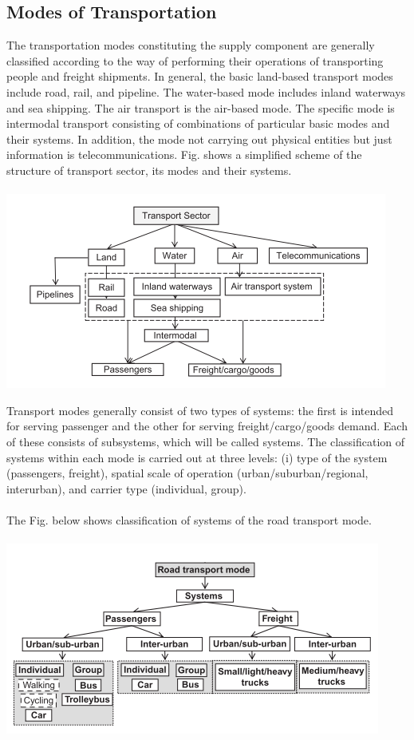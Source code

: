 \subsection{Modes of Transportation}
\par
The transportation modes constituting the supply component are generally classified according to
the way of performing their operations of transporting people and freight shipments. In general, the basic land-based transport modes include road, rail, and pipeline. The water-based mode includes inland waterways and sea shipping. The air transport is the air-based mode. The specific mode is intermodal transport consisting of combinations of particular basic modes and their systems. In addition, the mode not carrying out physical entities but just information is telecommunications. Fig. shows a simplified scheme of the structure of transport sector, its modes and their systems.
\\\\
\includegraphics{gfx/fig1.png}
\par
Transport modes generally consist of two types of systems: the first is intended for serving passenger and the other for serving freight/cargo/goods demand. Each of these consists of subsystems, which will be called systems. The classification of systems within each mode is carried out at three levels: (i) type of the system (passengers, freight), spatial scale of operation (urban/suburban/regional, interurban), and carrier type (individual, group).
\\\\
The Fig. below shows classification of systems of the road transport mode.
\\\\
\includegraphics{gfx/fig2.png}
\\\\
%
